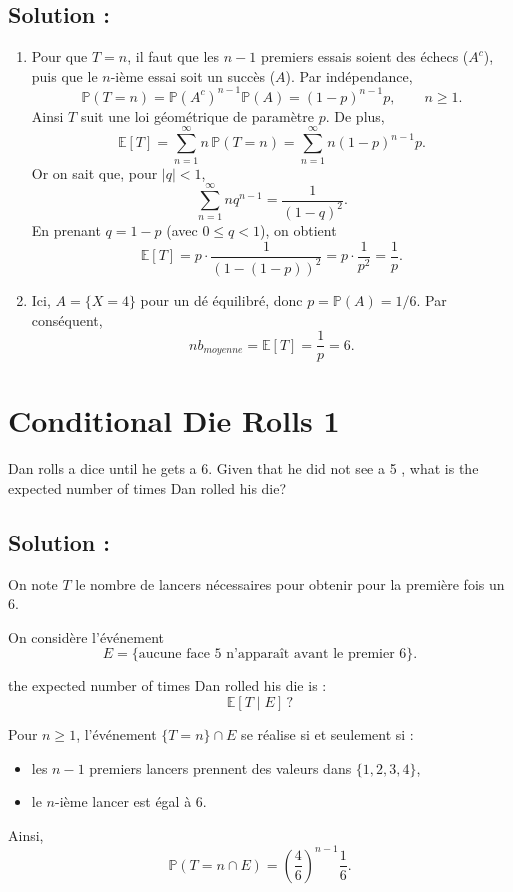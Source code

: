 \subsection*{Solution :}


\begin{enumerate}
\item Pour que $T=n$, il faut que les $n-1$ premiers essais soient des échecs ($A^c$),
puis que le $n$-ième essai soit un succès ($A$). Par indépendance,
\[
\mathbb{P}(T=n)=\mathbb{P}(A^c)^{n-1}\mathbb{P}(A)=(1-p)^{n-1}p,\qquad n\ge 1.
\]
Ainsi $T$ suit une loi géométrique de paramètre $p$. De plus,
\[
\mathbb{E}[T]=\sum_{n=1}^{\infty} n\,\mathbb{P}(T=n)
=\sum_{n=1}^{\infty} n(1-p)^{n-1}p.
\]
Or on sait que, pour $|q|<1$,
\[
\sum_{n=1}^{\infty} n q^{n-1}=\frac{1}{(1-q)^2}.
\]
En prenant $q=1-p$ (avec $0\le q<1$), on obtient
\[
\mathbb{E}[T]=p\cdot \frac{1}{(1-(1-p))^2}=p\cdot \frac{1}{p^2}=\frac{1}{p}.
\]

\item Ici, $A=\{X=4\}$ pour un dé équilibré, donc $p=\mathbb{P}(A)=1/6$.
Par conséquent,
\[
nb_{moyenne} = \mathbb{E}[T]=\frac{1}{p}=6.
\]
\end{enumerate}


\section{Conditional Die Rolls 1}

\begin{exerciseBox}
Dan rolls a dice until he gets a 6. Given that he did not see a  5
, what is the expected number of times Dan rolled his die?


\end{exerciseBox}

\subsection*{Solution :}

On note $T$ le nombre de lancers nécessaires pour obtenir pour la première fois un $6$.

On considère l’événement
\[
E=\{\text{aucune face $5$ n’apparaît avant le premier $6$}\}.
\]

the expected number of times Dan rolled his die is : 
\[
\mathbb{E}[T\mid E] \, ?
\]

Pour $n\ge 1$, l’événement $\{T=n\}\cap E$ se réalise si et seulement si :
\begin{itemize}
\item les $n-1$ premiers lancers prennent des valeurs dans $\{1,2,3,4\}$,
\item le $n$-ième lancer est égal à $6$.
\end{itemize}
Ainsi,
\[
\mathbb{P}(T=n\cap E)
=
\left(\frac{4}{6}\right)^{n-1}\frac{1}{6}.
\]

